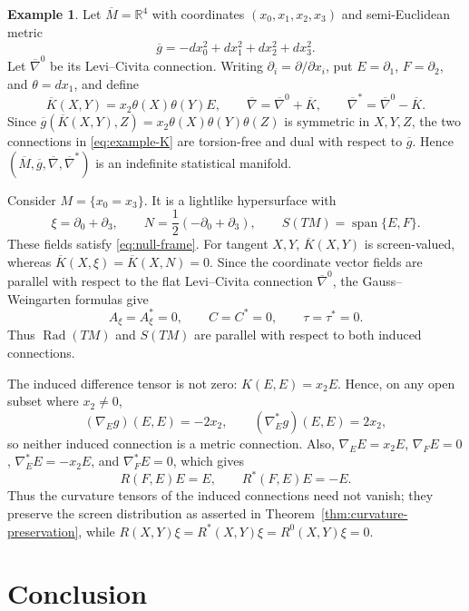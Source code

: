 \documentclass[11pt,a4paper]{article}
\theoremstyle{remark}
\theoremstyle{definition}
\newtheorem{example}[theorem]{Example}
\newcommand{\Rad}{\operatorname{Rad}}
\begin{document}
\begin{example}\label{ex:nonmetric-parallel}
Let $\overline M=\mathbb R^{4}$ with coordinates
$(x_0,x_1,x_2,x_3)$ and semi-Euclidean metric
\[
\overline g=-dx_0^{2}+dx_1^{2}+dx_2^{2}+dx_3^{2}.
\]
Let $\overline\nabla^{0}$ be its Levi--Civita connection. Writing
$\partial_i=\partial/\partial x_i$, put
$E=\partial_{1}$, $F=\partial_{2}$, and $\theta=dx_1$, and define
\begin{equation}\label{eq:example-K}
\overline K(X,Y)=x_2\theta(X)\theta(Y)E,
\qquad
\overline\nabla=\overline\nabla^{0}+\overline K,
\qquad
\overline\nabla^{*}=\overline\nabla^{0}-\overline K.
\end{equation}
Since
$\overline g(\overline K(X,Y),Z)
=x_2\theta(X)\theta(Y)\theta(Z)$ is symmetric in $X,Y,Z$, the two
connections in \eqref{eq:example-K} are torsion-free and dual with
respect to $\overline g$. Hence
$(\overline M,\overline g,\overline\nabla,\overline\nabla^{*})$ is an
indefinite statistical manifold.

Consider $M=\{x_0=x_3\}$. It is a lightlike hypersurface with
\[
\xi=\partial_0+\partial_3,
\qquad
N=\frac12(-\partial_0+\partial_3),
\qquad
S(TM)=\operatorname{span}\{E,F\}.
\]
These fields satisfy \eqref{eq:null-frame}. For tangent $X,Y$,
$\overline K(X,Y)$ is screen-valued, whereas
$\overline K(X,\xi)=\overline K(X,N)=0$. Since the coordinate vector
fields are parallel with respect to the flat Levi--Civita connection
$\overline\nabla^{0}$, the Gauss--Weingarten formulas give
\[
A_{\xi}=A_{\xi}^{*}=0,
\qquad C=C^{*}=0,
\qquad \tau=\tau^{*}=0.
\]
Thus $\Rad(TM)$ and $S(TM)$ are parallel with respect to both induced
connections.

The induced difference tensor is not zero: $K(E,E)=x_2E$. Hence, on any
open subset where $x_2\neq0$,
\[
(\nabla_Eg)(E,E)=-2x_2,
\qquad
(\nabla_E^{*}g)(E,E)=2x_2,
\]
so neither induced connection is a metric connection. Also,
$\nabla_EE=x_2E$, $\nabla_FE=0$,
$\nabla_E^{*}E=-x_2E$, and $\nabla_F^{*}E=0$, which gives
\[
R(F,E)E=E,
\qquad
R^{*}(F,E)E=-E.
\]
Thus the curvature tensors of the induced connections need not vanish; they
preserve the screen distribution as asserted in Theorem~\ref{thm:curvature-preservation},
while
$R(X,Y)\xi=R^{*}(X,Y)\xi=R^{0}(X,Y)\xi=0$.
\end{example}

\section{Conclusion}\label{sec:conclusion}
\end{document}
